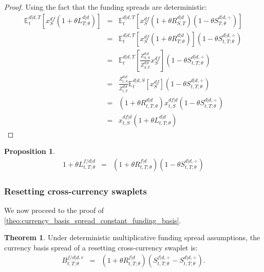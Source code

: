 \documentclass[11pt,english]{amsart}
\newcommand{\EE}{\mathbb{E}}
\theoremstyle{definition}
\newtheorem{prop}{Proposition}
\newtheorem*{theo*}{Theorem}
\begin{document}
\begin{proof}\label{proof:resetting_notional_libor_lemma}
Using the fact that the funding spreads are deterministic:
\begin{eqnarray*}
	 \EE^{d|d,T}_t\left[ x^{df}_S(1+\theta L^{d|d}_{T;\theta} )\right] 
	&=&  \EE^{d|d,T}_t\left[ x^{df}_S(1+\theta R^{d|d}_{S,T} ) \left(1-\theta S^{d|d,\div}_{T;\theta} \right) \right]  \\ 
	&=& \EE^{d|d,T}_t\left[ x^{df}_S(1+\theta R^{d|d}_{T;\theta} )\right] \left(1-\theta S^{d|d,\div}_{t,T;\theta} \right) \\
	&=& \EE^{d|d,T}_t\left[ \frac{Z^{d|d}_{S,S}}{Z^{d|d}_{S,T}}x^{df}_S \right] \left(1-\theta S^{d|d,\div}_{t,T;\theta} \right) \\
	&=& \frac{Z^{d|d}_{t,S}}{Z^{d|d}_{t,T}}  \EE^{d|d,S}_t\left[ x^{df}_S \right] \left(1-\theta S^{d|d,\div}_{t,T;\theta} \right) \\
	&=&   \left(1+\theta R^{d|d}_{t,T;\theta} \right) x^{df|d}_{t,S}  \left(1-\theta S^{d|d,\div}_{t,T;\theta} \right) \\
	&=&  x^{df|d}_{t,S}  \left( 1+\theta L^{d|d}_{t,T;\theta} \right)
\end{eqnarray*} 
\end{proof}


\begin{prop}
\begin{eqnarray}
  1+\theta L^{f/d|d}_{t,T;\theta} 
  &=& \left( 1+\theta R^{f|d}_{t,T;\theta} \right) \left( 1 - \theta S^{d|d,\div}_{t,T;\theta} \right)
\end{eqnarray} 
\end{prop}


\subsubsection{Resetting cross-currency swaplets}

We now proceed to the proof of \autoref{theo:currency_basis_spread_constant_funding_basis}.
\begin{theo*}
Under deterministic multiplicative funding spread assumptions, the currency basis spread of a resetting cross-currency swaplet is:
\begin{eqnarray*}
	B^{f/d|d,r}_{t,T;\theta} 
	&=& \left(1+\theta R^{f|d}_{t,T;\theta} \right)  \left(S^{f|d,\div}_{t,T;\theta} - S^{d|d,\div}_{t,T;\theta} \right)  .
\end{eqnarray*} 
\end{theo*}
\end{document}
